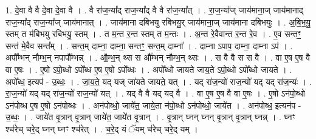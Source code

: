 \documentclass[17pt]{extarticle}
\begin{document}
1. दे॒वा वै वै दे॒वा दे॒वा वै । . वै रा॑ज॒न्या᳚द् राज॒न्या᳚द् वै वै रा॑ज॒न्या᳚त् । . रा॒ज॒न्या᳚ज् जाय॑माना॒ज् जाय॑मानाद् राज॒न्या᳚द् राज॒न्या᳚ज् जाय॑मानात् । . जाय॑माना दबिभयु रबिभयु॒र् जाय॑माना॒ज् जाय॑माना दबिभयुः । . अ॒बि॒भ॒यु॒ स्तम् त म॑बिभयु रबिभयु॒ स्तम् । . त म॒न्त र॒न्त स्तम् त म॒न्तः । . अ॒न्त रे॒वैवान्त र॒न्त रे॒व । . ए॒व सन्तꣳ॒॒ सन्त॑ मे॒वैव सन्त᳚म् । . सन्त॒म् दाम्ना॒ दाम्ना॒ सन्तꣳ॒॒ सन्त॒म् दाम्ना᳚ । . दाम्ना ऽपाप॒ दाम्ना॒ दाम्ना ऽप॑ । . अपौ᳚म्भन् नौम्भ॒न् नपापौ᳚म्भन्न् । . औ॒म्भ॒न् थ्स स औ᳚म्भन् नौम्भ॒न् थ्सः । . स वै वै स स वै । . वा ए॒ष ए॒ष वै वा ए॒षः । . ए॒षो ऽपो॒ब्धो ऽपो᳚ब्ध ए॒ष ए॒षो ऽपो᳚ब्धः । . अपो᳚ब्धो जायते जाय॒ते ऽपो॒ब्धो ऽपो᳚ब्धो जायते । . अपो᳚ब्ध॒ इत्यप॑ - उ॒ब्धः॒ । . जा॒य॒ते॒ यद् यज् जा॑यते जायते॒ यत् । . यद् रा॑ज॒न्यो॑ राज॒न्यो॑ यद् यद् रा॑ज॒न्यः॑ । . रा॒ज॒न्यो॑ यद् यद् रा॑ज॒न्यो॑ राज॒न्यो॑ यत् । . यद् वै वै यद् यद् वै । . वा ए॒ष ए॒ष वै वा ए॒षः । . ए॒षो ऽन॑पो॒ब्धो ऽन॑पोब्ध ए॒ष ए॒षो ऽन॑पोब्धः । . अन॑पोब्धो॒ जाये॑त॒ जाये॒ता न॑पो॒ब्धो ऽन॑पोब्धो॒ जाये॑त । . अन॑पोब्ध॒ इत्यन॑प - उ॒ब्धः॒ । . जाये॑त वृ॒त्रान् वृ॒त्रान् जाये॑त॒ जाये॑त वृ॒त्रान् । . वृ॒त्रान् घ्नन् घ्नन् वृ॒त्रान् वृ॒त्रान् घ्नन्न् । . घ्नꣳ श्च॑रेच् चरे॒द् घ्नन् घ्नꣳ श्च॑रेत् । . च॒रे॒द् यं ॅयम् च॑रेच् चरे॒द् यम् । \newline
\end{document}
